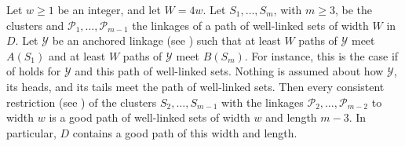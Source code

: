 \documentclass[fontsize=12pt,leading=14pt]{fullpaper}
\newcommand{\Pcal}{\mathcal{P}}
\newcommand{\Ycal}{\mathcal{Y}}
\begin{document}
\begin{lemma}\label{lem:return}
  Let $w\ge1$ be an integer, and let $W=4w$.
  Let $S_1,\dots,S_m$, with $m\ge3$, be the clusters and $\Pcal_1,\dots,\Pcal_{m-1}$ the linkages of a path of well-linked sets of width $W$ in $D$.
  Let $\Ycal$ be an anchored linkage (see ) such that at least $W$ paths of $\Ycal$ meet $A(S_1)$ and at least $W$ paths of $\Ycal$ meet $B(S_m)$.
  For instance, this is the case if  of  holds for $\Ycal$ and this path of well-linked sets.
  Nothing is assumed about how $\Ycal$, its heads, and its tails meet the path of well-linked sets.
  Then every consistent restriction (see ) of the clusters $S_2,\dots,S_{m-1}$ with the linkages $\Pcal_2,\dots,\Pcal_{m-2}$ to width $w$ is a good path of well-linked sets of width $w$ and length $m-3$.
  In particular, $D$ contains a good path of this width and length.
\end{lemma}
\end{document}
